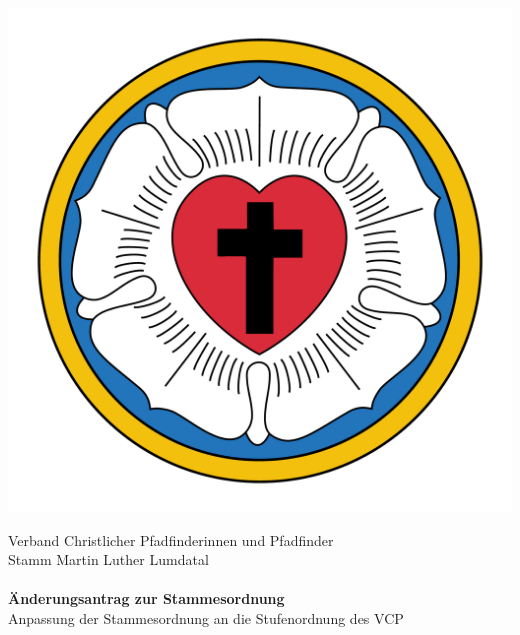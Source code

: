 \documentclass[a4paper]{article}
\begin{document}
\begin{center}
    \begin{minipage}{.2\textwidth}
        \flushleft
        \includegraphics[width=1\linewidth]{Lutherrose.pdf}
    \end{minipage}%
    \begin{minipage}{.6\textwidth}
        \begin{center}
            \footnotesize Verband Christlicher Pfadfinderinnen und Pfadfinder\\
            \large Stamm Martin Luther Lumdatal\\
            ~\\
            \Large \textbf{Änderungsantrag zur Stammesordnung}\\
            \normalsize Anpassung der Stammesordnung an die Stufenordnung des VCP\\
            ~\\[1cm]
        \end{center}
    \end{minipage}%
    \begin{minipage}{.2\textwidth}
        \flushright

\end{minipage}
\end{center}
\end{document}
